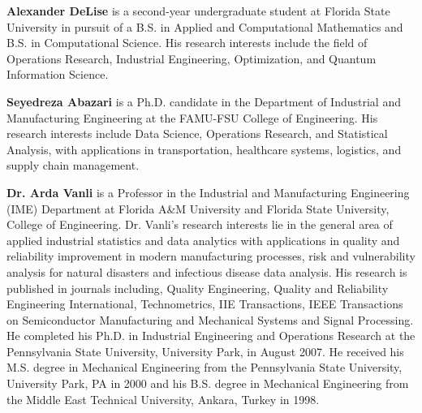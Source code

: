 \documentclass{article}
\begin{document}
\begin{ieombiography}
  \textbf{Alexander DeLise} is a second-year undergraduate student at Florida State University in pursuit of a B.S. in Applied and Computational Mathematics and B.S. in Computational Science. His research interests include the field of Operations Research, Industrial Engineering, Optimization, and Quantum Information Science. 

  \noindent \textbf{Seyedreza Abazari} is a Ph.D. candidate in the Department of Industrial and Manufacturing Engineering at the FAMU-FSU College of Engineering. His research interests include Data Science, Operations Research, and Statistical Analysis, with applications in transportation, healthcare systems, logistics, and supply chain management.

  \noindent \textbf{Dr. Arda Vanli} is a Professor in the Industrial and Manufacturing Engineering (IME) Department at Florida A\&M University and Florida State University, College of Engineering. Dr. Vanli's research interests lie in the general area of applied industrial statistics and data analytics with applications in quality and reliability improvement in modern manufacturing processes, risk and vulnerability analysis for natural disasters and infectious disease data analysis. His research is published in journals including, Quality Engineering, Quality and Reliability Engineering International, Technometrics, IIE Transactions, IEEE Transactions on Semiconductor Manufacturing and Mechanical Systems and Signal Processing. He completed his Ph.D. in Industrial Engineering and Operations Research at the Pennsylvania State University, University Park, in August 2007. He received his M.S. degree in Mechanical Engineering from the Pennsylvania State University, University Park, PA in 2000 and his B.S. degree in Mechanical Engineering from the Middle East Technical University, Ankara, Turkey in 1998.
\end{ieombiography}
 
\end{document}
